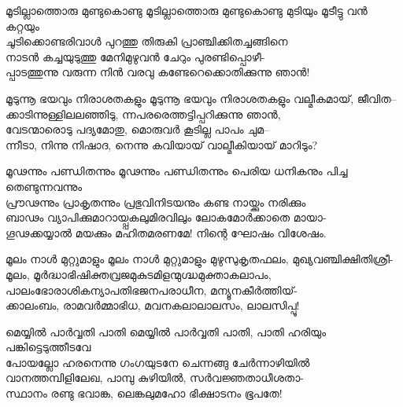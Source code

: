 \begin{enumerate}


\begin{slokam}{\VSv}{\Poonth}{മൂടില്ലാത്തൊരു മുണ്ടുകൊണ്ടു}
മൂടില്ലാത്തൊരു മുണ്ടുകൊണ്ടു മുടിയും മൂടീട്ടു വൻ കറ്റയും\\
ചൂടിക്കൊണ്ടരിവാള്‍ പുറത്തു തിരുകി പ്രാഞ്ചിക്കിതച്ചങ്ങിനെ\\
നാടൻ കച്ചയുടുത്തു മേനിമുഴുവൻ ചേറും പുരണ്ടിപ്പൊഴീ-\\
പ്പാടത്തുന്നു വരുന്ന നിൻ വരവു കണ്ടേറെക്കൊതിക്കുന്നു ഞാൻ!
\end{slokam}




\begin{slokam}{\VSv}{\UN}{മൂടുന്നൂ ഭയവും നിരാശതകളും}
മൂടുന്നൂ ഭയവും നിരാശതകളും വല്മീകമായ്, ജീവിത--\\
ക്കാടിന്നുള്ളിലലഞ്ഞിടു, ന്നപരരെത്തട്ടിപ്പറിക്കുന്നു ഞാൻ,\\
വേടന്മാരൊടു പദ്യമോതു, മൊരുവർ കൂടില്ല പാപം ചുമ--\\
ന്നീടാ, നിന്നു നിഷാദ, നെന്നു കവിയായ് വാല്മീകിയായ് മാറിടും?
\end{slokam}


\begin{slokam}{\VSr}{\KKT}{മൂഢന്നും പണ്ഡിതന്നും}
 മൂഢന്നും പണ്ഡിതന്നും പെരിയ ധനികനും പിച്ച തെണ്ടുന്നവന്നും\\
പ്രൗഢന്നും പ്രാകൃതന്നും പ്രഭുവിനിടയനും കണ്ട നായ്ക്കും നരിക്കും\\
ബാഢം വ്യാപിക്കുമാറായ്പ്പകലുമിരവിലും ലോകമോർക്കാതെ മായാ-\\
ഗൂഢക്കയ്യാൽ മയക്കും മഹിതമരണമേ! നിന്റെ ഘോഷം വിശേഷം.
\end{slokam}


\begin{slokam}{\VSr}{\Ull}{മൂലം നാള്‍ മുറ്റുമാളും}
 മൂലം നാള്‍ മുറ്റുമാളും മുഴുസുകൃതഫലം, മുഖ്യവഞ്ചിക്ഷിതിശ്രീ-\\
മൂലം, മൂർദ്ധാഭിഷിക്തവ്രജമുകുടമിളന്മുഗ്ദ്ധമുക്താകലാപം,\\
പാലംഭോരാശികന്യാപതിഭജനപരാധീന, മന്യൂനകീർത്തിയ്‌-\\
ക്കാലംബം, രാമവർമ്മാഭിധ, മവനകലാലാലസം, ലാലസിപ്പൂ!
\end{slokam}


\begin{slokam}{\VSv}{\ARRV}{മെയ്യില്‍ പാര്‍വ്വതി പാതി}
മെയ്യില്‍ പാര്‍വ്വതി പാതി, പാതി ഹരിയും പങ്കിട്ടെടുത്തീടവേ\\
പോയല്ലോ ഹരനെന്നു ഗംഗയുടനേ ചെന്നങ്ങു ചേര്‍ന്നാഴിയില്‍\\
വാനത്തമ്പിളിലേഖ, പാമ്പു കുഴിയില്‍, സര്‍വജ്ഞതാധീശതാ-\\
സ്ഥാനം രണ്ടു ഭവാങ്ക, ലെങ്കലുമഹോ ഭിക്ഷാടനം ഭൂപതേ!
\end{slokam}


\end{enumerate}
